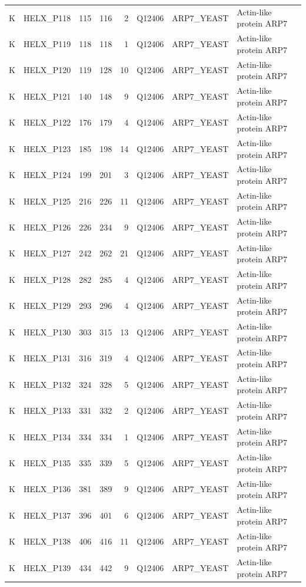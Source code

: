 \begin{longtable}{@{}llrrrrllp{5.2cm}@{}}
  K & HELX_P118 & 115 & 116 & 2 & Q12406 & ARP7_YEAST & Actin-like protein ARP7 \\
  K & HELX_P119 & 118 & 118 & 1 & Q12406 & ARP7_YEAST & Actin-like protein ARP7 \\
  K & HELX_P120 & 119 & 128 & 10 & Q12406 & ARP7_YEAST & Actin-like protein ARP7 \\
  K & HELX_P121 & 140 & 148 & 9 & Q12406 & ARP7_YEAST & Actin-like protein ARP7 \\
  K & HELX_P122 & 176 & 179 & 4 & Q12406 & ARP7_YEAST & Actin-like protein ARP7 \\
  K & HELX_P123 & 185 & 198 & 14 & Q12406 & ARP7_YEAST & Actin-like protein ARP7 \\
  K & HELX_P124 & 199 & 201 & 3 & Q12406 & ARP7_YEAST & Actin-like protein ARP7 \\
  K & HELX_P125 & 216 & 226 & 11 & Q12406 & ARP7_YEAST & Actin-like protein ARP7 \\
  K & HELX_P126 & 226 & 234 & 9 & Q12406 & ARP7_YEAST & Actin-like protein ARP7 \\
  K & HELX_P127 & 242 & 262 & 21 & Q12406 & ARP7_YEAST & Actin-like protein ARP7 \\
  K & HELX_P128 & 282 & 285 & 4 & Q12406 & ARP7_YEAST & Actin-like protein ARP7 \\
  K & HELX_P129 & 293 & 296 & 4 & Q12406 & ARP7_YEAST & Actin-like protein ARP7 \\
  K & HELX_P130 & 303 & 315 & 13 & Q12406 & ARP7_YEAST & Actin-like protein ARP7 \\
  K & HELX_P131 & 316 & 319 & 4 & Q12406 & ARP7_YEAST & Actin-like protein ARP7 \\
  K & HELX_P132 & 324 & 328 & 5 & Q12406 & ARP7_YEAST & Actin-like protein ARP7 \\
  K & HELX_P133 & 331 & 332 & 2 & Q12406 & ARP7_YEAST & Actin-like protein ARP7 \\
  K & HELX_P134 & 334 & 334 & 1 & Q12406 & ARP7_YEAST & Actin-like protein ARP7 \\
  K & HELX_P135 & 335 & 339 & 5 & Q12406 & ARP7_YEAST & Actin-like protein ARP7 \\
  K & HELX_P136 & 381 & 389 & 9 & Q12406 & ARP7_YEAST & Actin-like protein ARP7 \\
  K & HELX_P137 & 396 & 401 & 6 & Q12406 & ARP7_YEAST & Actin-like protein ARP7 \\
  K & HELX_P138 & 406 & 416 & 11 & Q12406 & ARP7_YEAST & Actin-like protein ARP7 \\
  K & HELX_P139 & 434 & 442 & 9 & Q12406 & ARP7_YEAST & Actin-like protein ARP7 \\

\end{longtable}
